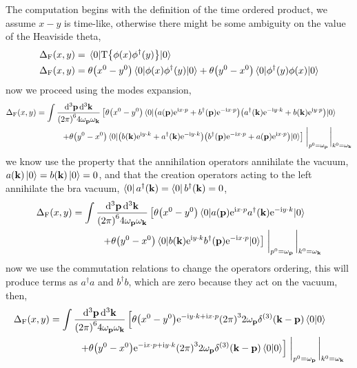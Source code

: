 The computation begins with the definition of the time ordered product, we assume $x-y$ is time-like, otherwise there might be some ambiguity on the value of the Heaviside theta,
\begin{align}
    \Delta_{\textnormal{F}}\qty(x,y) &= \mel{0}{\textnormal{T}\qty{\phi\qty(x)\phi^\dagger\qty(y)}}{0}\\
    \Delta_{\textnormal{F}}\qty(x,y) &= \theta\qty(x^0-y^0)\mel{0}{\phi\qty(x)\phi^\dagger\qty(y)}{0}+\theta\qty(y^0-x^0)\mel{0}{\phi^\dagger\qty(y)\phi\qty(x)}{0}
\end{align}
now we proceed using the modes expansion,
\begin{align}
    \Delta_{\textnormal{F}}\qty(x,y) &= \int\frac{\dd[3]{\vb p}\dd[3]{\vb k}}{\qty(2\pi)^64\omega_{\vb p}\omega_{\vb k}}\left[\theta\qty(x^0-y^0)\mel{0}{\qty(a\qty(\vb p)\e^{\im x\cdot p}+b^\dagger\qty(\vb p)\e^{-\im x\cdot p})\qty(a^\dagger\qty(\vb k)\e^{-\im y\cdot k}+b\qty(\vb k)\e^{\im y\cdot p})}{0}\right.\nonumber\\
    &\quad\quad\quad\left.+\theta\qty(y^0-x^0)\mel{0}{\qty(b\qty(\vb k)\e^{\im y\cdot k}+a^\dagger\qty(\vb k)\e^{-\im y\cdot k})\qty(b^\dagger\qty(\vb p)\e^{-\im x\cdot p}+a\qty(\vb p)\e^{\im x\cdot p})}{0}\right]\eval_{p^0=\omega_{\vb p}}\eval_{k^0=\omega_{\vb k}}
\end{align}
we know use the property that the annihilation operators annihilate the vacuum, $a\qty(\vb k)\ket 0=b\qty(\vb k)\ket 0 =0$, and that the creation operators acting to the left annihilate the bra vacuum, $\bra 0 a^\dagger\qty(\vb k)=\bra 0 b^\dagger\qty(\vb k)=0$,
\begin{align}
    \Delta_{\textnormal{F}}\qty(x,y) &= \int\frac{\dd[3]{\vb p}\dd[3]{\vb k}}{\qty(2\pi)^64\omega_{\vb p}\omega_{\vb k}}\left[\theta\qty(x^0-y^0)\mel{0}{a\qty(\vb p)\e^{\im x\cdot p}a^\dagger\qty(\vb k)\e^{-\im y\cdot k}}{0}\right.\nonumber\\
    &\quad\quad\quad\left.+\theta\qty(y^0-x^0)\mel{0}{b\qty(\vb k)\e^{\im y\cdot k}b^\dagger\qty(\vb p)\e^{-\im x\cdot p}}{0}\right]\eval_{p^0=\omega_{\vb p}}\eval_{k^0=\omega_{\vb k}}
\end{align}
now we use the commutation relations to change the operators ordering, this will produce terms as $a^\dagger a$ and $b^\dagger b$, which are zero because they act on the vacuum, then,
\begin{align}
    \Delta_{\textnormal{F}}\qty(x,y) &= \int\frac{\dd[3]{\vb p}\dd[3]{\vb k}}{\qty(2\pi)^64\omega_{\vb p}\omega_{\vb k}}\left[\theta\qty(x^0-y^0)\e^{-\im y\cdot k+\im x\cdot p}\qty(2\pi)^32\omega_{\vb p}\delta^{\qty(3)}\qty(\vb k-\vb p)\braket{0}{0}\right.\nonumber\\
    &\quad\quad\quad\left.+\theta\qty(y^0-x^0)\e^{-\im x\cdot p+\im y\cdot k}\qty(2\pi)^32\omega_{\vb p}\delta^{\qty(3)}\qty(\vb k-\vb p)\braket{0}{0}\right]\eval_{p^0=\omega_{\vb p}}\eval_{k^0=\omega_{\vb k}}
\end{align}
